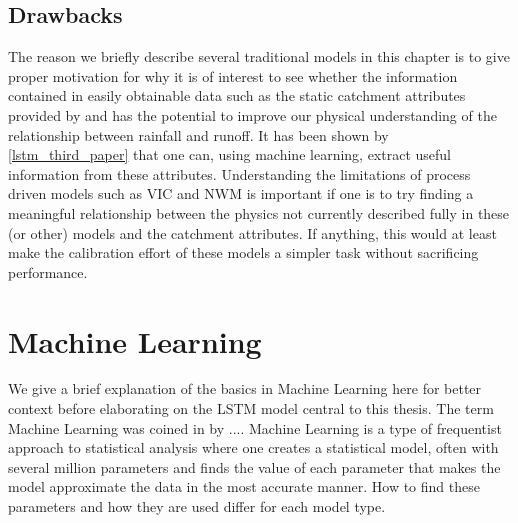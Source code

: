 \subsection{Drawbacks}
The reason we briefly describe several traditional models in this chapter is to 
give proper motivation for why it is of interest to see whether the information 
contained in easily obtainable data such as the static catchment attributes 
provided by \citet{CAMELS_US} and \citet{CAMELS_GB} has the potential to improve 
our physical understanding of the relationship between rainfall and runoff. It has 
been shown by \ref{lstm_third_paper} that one can, using machine learning, extract 
useful information from these attributes. Understanding the limitations of process 
driven models such as VIC and NWM is important if one is to try finding a 
meaningful relationship between the physics not currently described fully in these 
(or other) models and the catchment attributes. If anything, this would at least 
make the calibration effort of these models a simpler task without sacrificing 
performance.


\section{Machine Learning}
We give a brief explanation of the basics in Machine Learning here for better context 
before elaborating on the LSTM model central to this thesis.
The term Machine Learning was coined in \citationneeded by .... 
Machine Learning is a type of frequentist approach to statistical analysis where 
one creates a statistical model, often with several million parameters and finds 
the value of each parameter that makes the model approximate the data in the most 
accurate manner. How to find these parameters and how they are used differ for each 
model type. 
